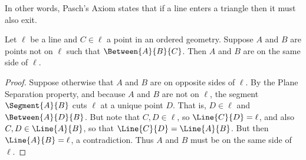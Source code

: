 \documentclass{article}
\begin{document}
In other words, Pasch's Axiom states that if a line enters a triangle then it must also exit.

\begin{lem}
Let $\ell$ be a line and $C \in \ell$ a point in an ordered geometry. Suppose $A$ and $B$ are points not on $\ell$ such that $\Between{A}{B}{C}$. Then $A$ and $B$ are on the same side of $\ell$.
\end{lem}

\begin{proof}
Suppose otherwise that $A$ and $B$ are on opposite sides of $\ell$. By the Plane Separation property, and because $A$ and $B$ are not on $\ell$, the segment $\Segment{A}{B}$ cuts $\ell$ at a unique point $D$. That is, $D \in \ell$ and $\Between{A}{D}{B}$. But note that $C, D \in \ell$, so $\Line{C}{D} = \ell$, and also $C, D \in \Line{A}{B}$, so that $\Line{C}{D} = \Line{A}{B}$. But then $\Line{A}{B} = \ell$, a contradiction. Thus $A$ and $B$ must be on the same side of $\ell$.
\end{proof}
\end{document}
